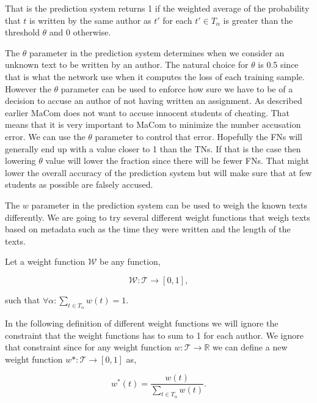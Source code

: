 That is the prediction system returns 1 if the weighted average of the
probability that $t$ is written by the same author as $t'$ for each $t' \in
T_\alpha$ is greater than the threshold $\theta$ and 0 otherwise.

The $\theta$ parameter in the prediction system determines when we consider
an unknown text to be written by an author. The natural choice for $\theta$
is 0.5 since that is what the network use when it computes the loss of each
training sample. However the $\theta$ parameter can be used to enforce how
sure we have to be of a decision to accuse an author of not having written
an assignment. As described earlier MaCom does not want to accuse innocent
students of cheating. That means that it is very important to MaCom to minimize
the number accusation error. We can use the $\theta$ parameter to control that
error. Hopefully the \glspl{FN} will generally end up with a value closer to 1
than the \glspl{TN}. If that is the case then lowering $\theta$ value will lower
the fraction since there will be fewer \glspl{FN}. That might lower the overall
accuracy of the prediction system but will make sure that at few students as
possible are falsely accused.

The $w$ parameter in the prediction system can be used to weigh the known texts
differently. We are going to try several different weight functions that weigh
texts based on metadata such as the time they were written and the length of
the texts.

\begin{definition}
    \label{def:weight_function}

    Let a weight function $\mathcal{W}$ be any function,

    \begin{equation}
        \mathcal{W} \colon \mathcal{T} \rightarrow [0, 1],
    \end{equation}

    such that $\forall \alpha \colon \sum_{t \in T_\alpha} w(t) = 1$.

\end{definition}

In the following definition of different weight functions we will ignore the
constraint that the weight functions has to sum to 1 for each author. We ignore
that constraint since for any weight function $w \colon \mathcal{T} \rightarrow
\mathbb{R}$ we can define a new weight function $w* \colon \mathcal{T}
\rightarrow [0, 1]$ as,

\begin{equation}\label{eq:normalize}
    w^*(t) = \frac{w(t)}{\sum_{t \in T_\alpha} w(t)}.
\end{equation}

